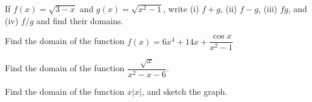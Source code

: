 \documentclass[notes]{subfiles}
\begin{document}
		
		\begin{ex}
			If $f(x) = \sqrt{3-x}$ and $g(x) =\sqrt{x^2-1}$, write (i) $f+g$, (ii) $f-g$, (iii) $fg$, and (iv) $f/g$ and find their domains.
		\end{ex}
			\newpage
			
		\begin{ex}
			Find the domain of the function $f(x) = 6x^4 + 14x + \dfrac{\cos x}{x^2-1}$
		\end{ex}
			
		\begin{ex}
			Find the domain of the function $\dfrac{\sqrt{x}}{x^2-x-6}$.
		\end{ex}
			
		\begin{ex}
			Find the domain of the function $x|x|$, and sketch the graph.
		\end{ex}

			\newpage
		
\end{document}

